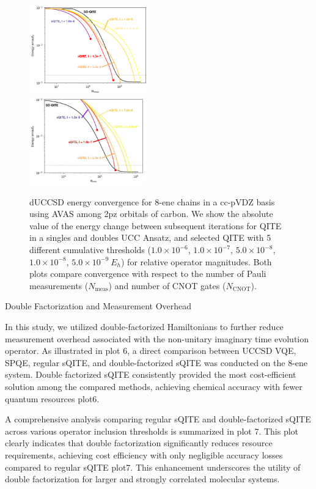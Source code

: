 \documentclass[aip,jcp,amsmath,amssymb, reprint]{revtex4-1}
\begin{document}
\begin{figure}[h!]
\centering
\includegraphics[width=0.45\textwidth]{sqite_paper/ene_plot_SD_v_selected.png}
\\
\includegraphics[width=0.45\textwidth]{sqite_paper/ene_plot_cnot.jpg}
\caption{dUCCSD energy convergence for 8-ene chains in a cc-pVDZ basis using AVAS among 2pz orbitals of carbon. We show the absolute value of the energy change between subsequent iterations for QITE in a singles and doubles UCC Ansatz, and selected QITE with 5 different cumulative thresholds ($1.0 \times 10^{-6}$, $1.0 \times 10^{-7}$, $5.0 \times 10^{-8}$, $1.0 \times 10^{-8}$, $5.0 \times 10^{-9}\ E_h$) for relative operator magnitudes. Both plots compare convergence with respect to the number of Pauli measurements ($N_\mathrm{meas}$) and number of CNOT gates ($N_\mathrm{CNOT}$).}
\label{fig:ene_plot}
\end{figure}

Double Factorization and Measurement Overhead

In this study, we utilized double-factorized Hamiltonians to further reduce measurement overhead associated with the non-unitary imaginary time evolution operator. As illustrated in plot 6, a direct comparison between UCCSD VQE, SPQE, regular sQITE, and double-factorized sQITE was conducted on the 8-ene system. Double factorized sQITE consistently provided the most cost-efficient solution among the compared methods, achieving chemical accuracy with fewer quantum resources {plot6}.

A comprehensive analysis comparing regular sQITE and double-factorized sQITE across various operator inclusion thresholds is summarized in plot 7. This plot clearly indicates that double factorization significantly reduces resource requirements, achieving cost efficiency with only negligible accuracy losses compared to regular sQITE {plot7}. This enhancement underscores the utility of double factorization for larger and strongly correlated molecular systems.
\end{document}
